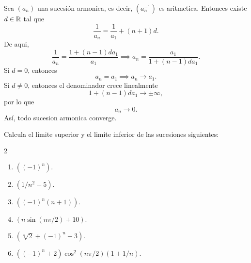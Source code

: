 \documentclass[12pt,a4paper]{article}
\begin{document}
\begin{solucion}
\begin{enumerate}
            Sea $(a_{n})$ una sucesión armonica, es decir, $(a_{n}^{-1})$ es aritmetica. Entonces existe $d\in\mathbb{R}$ tal que
            \begin{equation*}
                \frac{1}{a_{n}}=\frac{1}{a_{1}}+(n+1)d.
            \end{equation*}
            De aqui,
            \begin{equation*}
                \frac{1}{a_{n}}=\frac{1+(n-1)da_{1}}{a_{1}}\implies a_{n}=\frac{a_{1}}{1+(n-1)da_{1}}.
            \end{equation*}
            Si $d=0$, entonces
            \begin{equation*}
                a_{n}=a_{1}\implies a_{n}\to a_{1}.
            \end{equation*}
            Si $d\neq0$, entonces el denominador crece linealmente
            \begin{equation*}
                1+(n-1)da_{1}\to\pm\infty,
            \end{equation*}
            por lo que
            \begin{equation*}
                a_{n}\to0.
            \end{equation*}
            Así, todo sucesion armonica converge.
        \end{enumerate}
    \end{solucion}

    \begin{mdframed}[style=mdbluebox,frametitle={Ejercicio 7}]
        Calcula el límite superior y el limite inferior de las sucesiones siguientes:
        \begin{multicols}{2}
            \begin{enumerate}
                \item[(a)]  $\left(\left(-1\right)^{n}\right).$
                \item[(b)]  $\left(1/n^{2}+5\right).$
                \item[(c)]  $\left(\left(-1\right)^{n}\left(n+1\right)\right).$ 
                \item[(d)]  $\left(n\sin\left(n\pi/2\right)+10\right).$
                \item[(e)]  $\left(\sqrt[n]{2}+\left(-1\right)^{n}+3\right).$ 
                \item[(f)]  $\left(\left(-1\right)^{n}+2\right)\cos^{2}\left(n\pi/2\right)\left(1+1/n\right).$
            \end{enumerate}
        \end{multicols}
    \end{mdframed}
\end{document}
